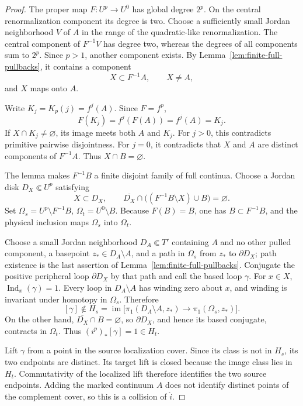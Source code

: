 \begin{proof}
The proper map \(F:U^{p}\to U^{0}\) has global degree \(2^{p}\). On the central renormalization component its degree is two. Choose a sufficiently small Jordan neighborhood \(V\) of \(A\) in the range of the quadratic-like renormalization. The central component of \(F^{-1}V\) has degree two, whereas the degrees of all components sum to \(2^{p}\). Since \(p>1\), another component exists. By Lemma~\ref{lem:finite-full-pullbacks}, it contains a component
\[
X\subset F^{-1}A,\qquad X\neq A,
\]
and \(X\) maps onto \(A\).

Write \(K_j=K_p(j)=f^{j}(A)\). Since \(F=f^{p}\),
\[
F(K_j)=f^{j}(F(A))=f^{j}(A)=K_j .
\]
If \(X\cap K_j\neq\varnothing\), its image meets both \(A\) and \(K_j\). For \(j>0\), this contradicts primitive pairwise disjointness. For \(j=0\), it contradicts that \(X\) and \(A\) are distinct components of \(F^{-1}A\). Thus \(X\cap B=\varnothing\).

The lemma makes \(F^{-1}B\) a finite disjoint family of full continua. Choose a Jordan disk \(D_X\Subset U^{p}\) satisfying
\[
X\subset D_X,\qquad \overline{D_X}\cap\bigl((F^{-1}B\setminus X)\cup B\bigr)=\varnothing .
\]
Set \(\Omega_s=U^{p}\setminus F^{-1}B\), \(\Omega_t=U^{0}\setminus B\). Because \(F(B)=B\), one has \(B\subset F^{-1}B\), and the physical inclusion maps \(\Omega_s\) into \(\Omega_t\).

Choose a small Jordan neighborhood \(D_A\Subset T'\) containing \(A\) and no other pulled component, a basepoint \(z_*\in D_A\setminus A\), and a path in \(\Omega_s\) from \(z_*\) to \(\partial D_X\); path existence is the last assertion of Lemma~\ref{lem:finite-full-pullbacks}. Conjugate the positive peripheral loop \(\partial D_X\) by that path and call the based loop \(\gamma\). For \(x\in X\), \(\operatorname{Ind}_x(\gamma)=1\). Every loop in \(D_A\setminus A\) has winding zero about \(x\), and winding is invariant under homotopy in \(\Omega_s\). Therefore
\[
[\gamma]\notin H_s=\operatorname{im}\bigl[\pi_1(D_A\setminus A,z_*)\to\pi_1(\Omega_s,z_*)\bigr].
\]
On the other hand, \(\overline{D_X}\cap B=\varnothing\), so \(\partial D_X\), and hence its based conjugate, contracts in \(\Omega_t\). Thus \((i^{p})_*[\gamma]=1\in H_t\).

Lift \(\gamma\) from a point in the source localization cover. Since its class is not in \(H_s\), its two endpoints are distinct. Its target lift is closed because the image class lies in \(H_t\). Commutativity of the localized lift therefore identifies the two source endpoints. Adding the marked continuum \(A\) does not identify distinct points of the complement cover, so this is a collision of \(\hat i\).


\end{proof}
